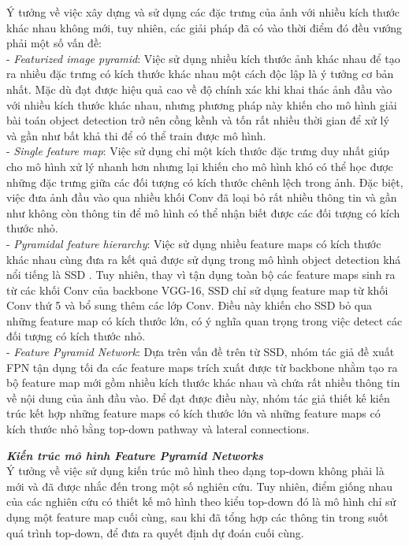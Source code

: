 {    \noindent
    Ý tưởng về việc xây dựng và sử dụng các đặc trưng của ảnh với nhiều kích thước khác nhau không mới, tuy nhiên, các giải pháp đã có vào thời điểm đó đều vướng phải một số vấn đề: \\
    - \textit{Featurized image pyramid}: Việc sử dụng nhiều kích thước ảnh khác nhau để tạo ra nhiều đặc trưng có kích thước khác nhau một cách độc lập là ý tưởng cơ bản nhất. Mặc dù đạt được hiệu quả cao về độ chính xác khi khai thác ảnh đầu vào với nhiều kích thước khác nhau, nhưng phương pháp này khiến cho mô hình giải bài toán object detection trở nên cồng kềnh và tốn rất nhiều thời gian để xử lý và gần như bất khả thi để có thể train được mô hình. \\
    - \textit{Single feature map}: Việc sử dụng chỉ một kích thước đặc trưng duy nhất giúp cho mô hình xử lý nhanh hơn nhưng lại khiến cho mô hình khó có thể học được những đặc trưng giữa các đối tượng có kích thước chênh lệch trong ảnh. Đặc biệt, việc đưa ảnh đầu vào qua nhiều khối Conv đã loại bỏ rất nhiều thông tin và gần như không còn thông tin để mô hình có thể nhận biết được các đối tượng có kích thước nhỏ. \\
    - \textit{Pyramidal feature hierarchy}: Việc sử dụng nhiều feature maps có kích thước khác nhau cùng đưa ra kết quả được sử dụng trong mô hình object detection khá nổi tiếng là SSD \cite{liu2016ssd}. Tuy nhiên, thay vì tận dụng toàn bộ các feature maps sinh ra từ các khối Conv của backbone VGG-16, SSD chỉ sử dụng feature map từ khối Conv thứ 5 và bổ sung thêm các lớp Conv. Điều này khiến cho SSD bỏ qua những feature map có kích thước lớn, có ý nghĩa quan trọng trong việc detect các đối tượng có kích thước nhỏ. \\
    - \textit{Feature Pyramid Network}: Dựa trên vấn đề trên từ SSD, nhóm tác giả đề xuất FPN tận dụng tối đa các feature maps trích xuất được từ backbone nhằm tạo ra bộ feature map mới gồm nhiều kích thước khác nhau và chứa rất nhiều thông tin về nội dung của ảnh đầu vào. Để đạt được điều này, nhóm tác giả thiết kế kiến trúc kết hợp những feature maps có kích thước lớn và những feature maps có kích thước nhỏ bằng top-down pathway và lateral connections.

    \noindent
    \textbf{\textit{Kiến trúc mô hình Feature Pyramid Networks}} \\
    Ý tưởng về việc sử dụng kiến trúc mô hình theo dạng top-down không phải là mới và đã được nhắc đến trong một số nghiên cứu. Tuy nhiên, điểm giống nhau của các nghiên cứu có thiết kế mô hình theo kiểu top-down đó là mô hình chỉ sử dụng một feature map cuối cùng, sau khi đã tổng hợp các thông tin trong suốt quá trình top-down, để đưa ra quyết định dự đoán cuối cùng.

}

